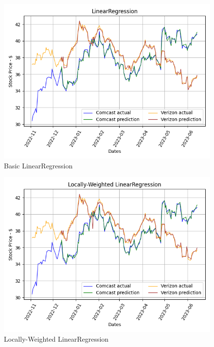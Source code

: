 \documentclass[conference]{IEEEtran}
\begin{document}
\begin{figure}
    \includegraphics[width=\columnwidth]{LinearRegression}
    \caption{Basic LinearRegression}
\end{figure}

\begin{figure}
    \includegraphics[width=\columnwidth]{Locally-Weighted LinearRegression}
    \caption{Locally-Weighted LinearRegression}
\end{figure}
\end{document}
